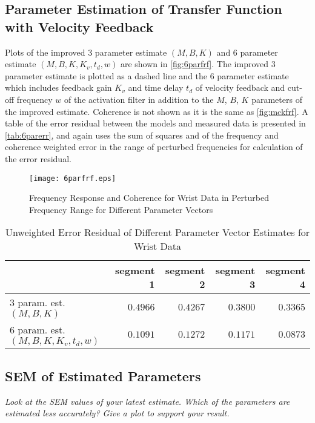 \documentclass[11pt,a4paper]{article}
\begin{document}
\subsection{Parameter Estimation of Transfer Function with Velocity Feedback}
Plots of the improved 3 parameter estimate $(M, B, K)$ and 6 parameter estimate
$(M, B, K, K_v, t_d, w)$ are shown in \autoref{fig:6parfrf}. The improved 3
parameter estimate is plotted as a dashed line and the 6 parameter estimate
which includes feedback gain $K_v$ and time delay $t_d$ of velocity feedback
and cut-off frequency $w$ of the activation filter in addition to the $M$, $B$,
$K$ parameters of the improved estimate.  Coherence is not shown as it is the
same as \autoref{fig:mckfrf}. A table of the error residual between the models
and measured data is presented in \autoref{tab:6parerr}, and again uses the sum
of squares and of the frequency and coherence weighted error in the range of
perturbed frequencies for calculation of the error residual.

\begin{figure}
    \centering
    \texttt{[image: 6parfrf.eps]}
    \caption{Frequency Response and Coherence for Wrist Data in Perturbed
        Frequency Range for Different Parameter Vectors}
    \label{fig:6parfrf}
\end{figure}

\begin{table}
    \centering
    \begin{tabular}{|l|r|r|r|r|}
        \hline
        \nonumber & segment 1 & segment 2 & segment 3 & segment 4 \\
        \hline
        3 param. est. $(M, B, K)$ &
            $0.4966$ & $0.4267$ & $0.3800$ & $0.3365$ \\
        6 param. est. $(M, B, K, K_v, t_d, w)$ &
            $0.1091$ & $0.1272$ & $0.1171$ & $0.0873$ \\
        \hline
    \end{tabular}
    \caption{Unweighted Error Residual of Different Parameter Vector Estimates
        for Wrist Data}
    \label{tab:6parerr}
\end{table}

\subsection{SEM of Estimated Parameters}
\textit{Look at the SEM values of your latest estimate. Which of the parameters
    are estimated less accurately? Give a plot to support your result.}
\end{document}
